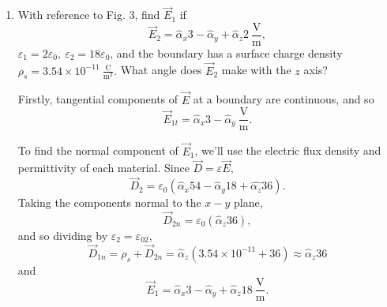 \documentclass{article}
\begin{document}
\begin{enumerate}[label=\thesubsection]
\begin{enumerate}[label=(\alph*)]
				Using the formula above, 
				\[
				  V = \frac{2Q}{2\pi\varepsilon_0 a}(1 - \frac{1}{\sqrt{5}}).
				\]
		\end{enumerate}
	\setcounter{subsection}{48}
	\item With reference to Fig. 3, find \(\vec{E}_1\) if 
		\[
			\vec{E}_2 = \hat{\alpha}_x3 - \hat{\alpha}_y + \hat{\alpha}_z2 \ \mathrm{\frac{V}{m}},
		\]
		\(\varepsilon_1 = 2\varepsilon_0, \ \varepsilon_2 = 18\varepsilon_0\), and the boundary has a surface charge density \(\rho_s = 3.54 \times 10^{-11} \ \mathrm{\frac{C}{m^2}}.\) What angle does \(\vec{E}_2\) make with the \(z\) axis?

		Firstly, tangential components of \(\vec{E}\) at a boundary are continuous, and so
		\[
			\vec{E}_{1t} = \hat{\alpha}_x3 - \hat{\alpha}_y \ \mathrm{\frac{V}{m}}.
		\]
		
		To find the normal component of \(\vec{E}_1\), we'll use the electric flux density and permittivity of each material. Since \(\vec{D} = \varepsilon \vec{E}\), 
		\[
		  \vec{D}_2 = \varepsilon_0(\hat{\alpha}_x54 - \hat{\alpha}_y18 + \hat{\alpha_z}36).
		\]
		Taking the components normal to the \(x-y\)	plane,
		\[
			\vec{D}_{2n} = \varepsilon_0(\hat{\alpha}_z36),
		\]
		and so dividing by \(\varepsilon_2 = \varepsilon_02\),
		\[
			\vec{D}_{1n} = \rho_s + \vec{D}_{2n} = \hat{\alpha}_z(3.54 \times 10^{-11} + 36) \approx \hat{\alpha}_z36
		\]
		and 
		\[
			\vec{E}_1 = \hat{\alpha}_x3-\hat{\alpha}_y + \hat{\alpha}_z18 \ \mathrm{\frac{V}{m}}.
		\]


\end{enumerate}
\end{document}

